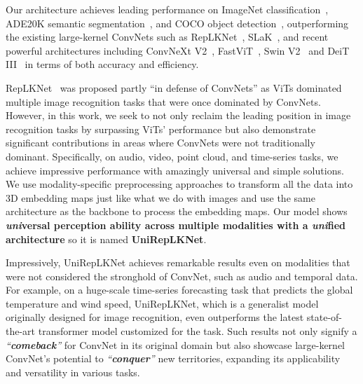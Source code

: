 \documentclass[10pt,twocolumn,letterpaper]{article}
\begin{document}
Our architecture achieves leading performance on ImageNet classification~\cite{deng2009imagenet}, ADE20K semantic segmentation~\cite{zhou2019semantic}, and COCO object detection~\cite{lin2014microsoft}, outperforming the existing large-kernel ConvNets such as RepLKNet~\cite{ding2022scaling}, SLaK~\cite{liu2022more}, and recent powerful architectures including ConvNeXt V2~\cite{woo2023convnext}, FastViT~\cite{vasu2023fastvit}, Swin V2~\cite{liu2022swin} and DeiT III~\cite{touvron2022deit} in terms of both accuracy and efficiency. 

RepLKNet~\cite{ding2022scaling} was proposed partly ``in defense of ConvNets'' as ViTs dominated multiple image recognition tasks that were once dominated by ConvNets. However, in this work, we seek to not only reclaim the leading position in image recognition tasks by surpassing ViTs' performance but also demonstrate significant contributions in areas where ConvNets were not traditionally dominant. Specifically, on audio, video, point cloud, and time-series tasks, we achieve impressive performance with amazingly universal and simple solutions. We use modality-specific preprocessing approaches to transform all the data into 3D embedding maps just like what we do with images and use the same architecture as the backbone to process the embedding maps. Our model shows \textbf{\emph{uni}versal perception ability across multiple modalities with a \emph{uni}fied architecture} so it is named \textbf{UniRepLKNet}. 

Impressively, UniRepLKNet achieves remarkable results even on modalities that were not considered the stronghold of ConvNet, such as audio and temporal data. For example, on a huge-scale time-series forecasting task that predicts the global temperature and wind speed, UniRepLKNet, which is a generalist model originally designed for image recognition, even outperforms the latest state-of-the-art transformer model customized for the task. Such results not only signify a \emph{``\textbf{comeback}''} for ConvNet in its original domain but also showcase large-kernel ConvNet's potential to \emph{``\textbf{conquer}''} new territories, expanding its applicability and versatility in various tasks.
\end{document}
